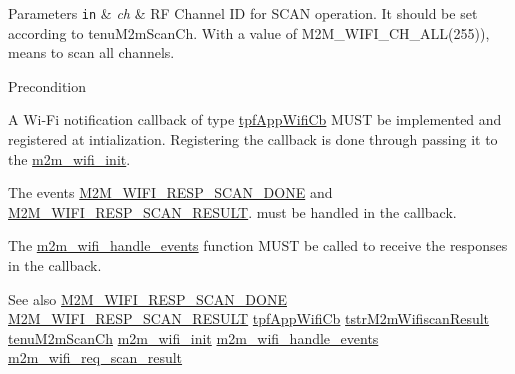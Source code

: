 \begin{DoxyParams}[1]{Parameters}
\mbox{\tt in}  & {\em ch} & RF Channel ID for S\+C\+AN operation. It should be set according to tenu\+M2m\+Scan\+Ch. With a value of M2\+M\+\_\+\+W\+I\+F\+I\+\_\+\+C\+H\+\_\+\+A\+L\+L(255)), means to scan all channels.\\
\hline
\end{DoxyParams}
\begin{DoxyPrecond}{Precondition}

\begin{DoxyItemize}
\item A Wi-\/\+Fi notification callback of type \hyperlink{group__WlanEnums_gac5302f32839285fe8375c159087aa8a1}{tpf\+App\+Wifi\+Cb} M\+U\+ST be implemented and registered at intialization. Registering the callback is done through passing it to the \hyperlink{group__WifiInitFn_ga73c734812e844d96d860c4e93e9daf35}{m2m\+\_\+wifi\+\_\+init}.
\item The events \hyperlink{group__WlanEnums_gga064de09dec1d5e88ed8d075fa40f57dead835febbe18b7e3cc6ce4693951354fe}{M2\+M\+\_\+\+W\+I\+F\+I\+\_\+\+R\+E\+S\+P\+\_\+\+S\+C\+A\+N\+\_\+\+D\+O\+NE} and \hyperlink{group__WlanEnums_gga064de09dec1d5e88ed8d075fa40f57deadfb48e88c3a8e5f9dac634d62d3f53e5}{M2\+M\+\_\+\+W\+I\+F\+I\+\_\+\+R\+E\+S\+P\+\_\+\+S\+C\+A\+N\+\_\+\+R\+E\+S\+U\+LT}. must be handled in the callback.
\item The \hyperlink{group__WifiHandleEventsFn_ga461a4edc057cec8c00cf124a07aa3b02}{m2m\+\_\+wifi\+\_\+handle\+\_\+events} function M\+U\+ST be called to receive the responses in the callback.
\end{DoxyItemize}
\end{DoxyPrecond}
\begin{DoxySeeAlso}{See also}
\hyperlink{group__WlanEnums_gga064de09dec1d5e88ed8d075fa40f57dead835febbe18b7e3cc6ce4693951354fe}{M2\+M\+\_\+\+W\+I\+F\+I\+\_\+\+R\+E\+S\+P\+\_\+\+S\+C\+A\+N\+\_\+\+D\+O\+NE} \hyperlink{group__WlanEnums_gga064de09dec1d5e88ed8d075fa40f57deadfb48e88c3a8e5f9dac634d62d3f53e5}{M2\+M\+\_\+\+W\+I\+F\+I\+\_\+\+R\+E\+S\+P\+\_\+\+S\+C\+A\+N\+\_\+\+R\+E\+S\+U\+LT} \hyperlink{group__WlanEnums_gac5302f32839285fe8375c159087aa8a1}{tpf\+App\+Wifi\+Cb} \hyperlink{structtstrM2mWifiscanResult}{tstr\+M2m\+Wifiscan\+Result} \hyperlink{group__WlanEnums_ga2a91dd671e2672dba1a7ed45230f3a99}{tenu\+M2m\+Scan\+Ch} \hyperlink{group__WifiInitFn_ga73c734812e844d96d860c4e93e9daf35}{m2m\+\_\+wifi\+\_\+init} \hyperlink{group__WifiHandleEventsFn_ga461a4edc057cec8c00cf124a07aa3b02}{m2m\+\_\+wifi\+\_\+handle\+\_\+events} \hyperlink{group__WifiReqScanResult_ga2585ee08ee8ecac67155ec99dd4d0863}{m2m\+\_\+wifi\+\_\+req\+\_\+scan\+\_\+result}
\end{DoxySeeAlso}
